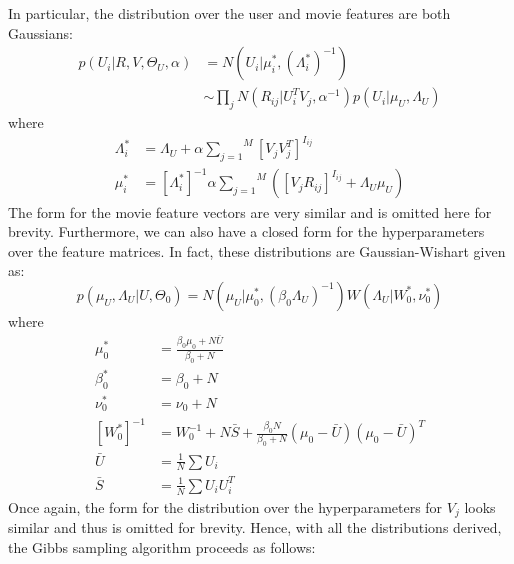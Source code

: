 \documentclass[journal,onecolumn]{IEEEtran}
\begin{document}
In particular, the distribution over the user and movie features are both Gaussians:
\begin{equation}
\begin{split}
	p(U_i | R, V, \Theta_U, \alpha) &= N(U_i |\mu_i^*, (\Lambda^*_i)^{-1})\\
	&\sim \underset{j}{\prod} N(R_{ij}|U_i^TV_j, \alpha^{-1}) p(U_i|\mu_U, \Lambda_U)
\end{split}
\end{equation}
where
\begin{equation*}
\begin{split}
	\Lambda^*_i &= \Lambda_U + \alpha \overset{M}{\underset{j=1}{\sum}}[V_jV_j^T]^{I_{ij}}\\
	\mu_i^* &= [\Lambda_i^*]^{-1} \alpha \overset{M}{\underset{j=1}{\sum}}([V_jR_{ij}]^{I_{ij}} + \Lambda_U \mu_U)
\end{split}
\end{equation*}
The form for the movie feature vectors are very similar and is omitted here for brevity. Furthermore, we can also have a closed form for the hyperparameters over the feature matrices. In fact, these distributions are Gaussian-Wishart given as:
\begin{equation}
	p(\mu_U, \Lambda_U|U, \Theta_0) = N(\mu_U|\mu_0^*, (\beta_0\Lambda_U)^{-1})W(\Lambda_U|W^*_0,\nu^*_0)
\end{equation}
where
\begin{equation*}
\begin{split}
\mu^*_0 &=\frac{\beta_0\mu_0+N\bar{U}}{\beta_0+N}\\ \beta^*_0 &= \beta_0 + N\\
\nu^*_0 &= \nu_0 + N\\
[W_0^*]^{-1} &= W_0^{-1} + N\bar{S} + \frac{\beta_0 N}{\beta_0 + N}(\mu_0-\bar{U})(\mu_0-\bar{U})^T\\
\bar{U} &= \frac{1}{N}\sum U_i\\
\bar{S} &= \frac{1}{N}\sum U_iU_i^T
\end{split}
\end{equation*}
Once again, the form for the distribution over the hyperparameters for $ V_j $  looks similar and thus is omitted for brevity. Hence, with all the distributions derived, the Gibbs sampling algorithm proceeds as follows:\\
\end{document}
